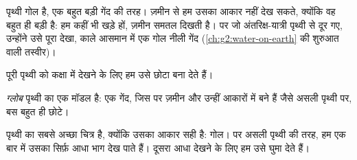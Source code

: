 पृथ्वी गोल है, एक बहुत बड़ी गेंद की तरह। ज़मीन से हम उसका आकार नहीं देख
सकते, क्योंकि वह बहुत ही बड़ी है: हम कहीं भी खड़े हों, ज़मीन समतल दिखती है।
पर जो अंतरिक्ष-यात्री पृथ्वी से दूर गए, उन्होंने उसे पूरा देखा, काले आसमान
में एक गोल नीली गेंद (\cref{ch:g2:water-on-earth} की शुरुआत वाली तस्वीर)।

पूरी पृथ्वी को कक्षा में देखने के लिए हम उसे छोटा बना देते हैं।

\begin{definition}[ग्लोब]\label{def:g3:continents-and-oceans:globe}
\emph{ग्लोब} पृथ्वी का एक मॉडल है: एक गेंद, जिस पर ज़मीन और
 उन्हीं आकारों में बने हैं जैसे असली पृथ्वी पर, बस बहुत ही छोटे।
\end{definition}

 पृथ्वी का सबसे अच्छा चित्र है, क्योंकि उसका आकार सही है: गोल। पर
असली पृथ्वी की तरह, हम एक बार में उसका सिर्फ़ आधा भाग देख पाते हैं। दूसरा
आधा देखने के लिए हम उसे घुमा देते हैं।

